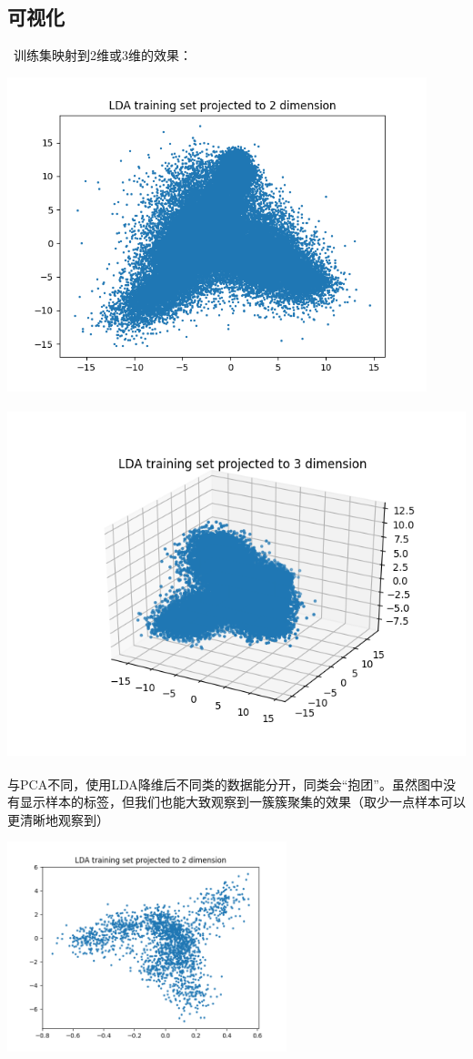 \documentclass[hyperref,UTF8]{ctexart}
\begin{document}
\subsection*{可视化}\
训练集映射到2维或3维的效果：\\
\centerline{\includegraphics[height=3.6in]{exp-results/lda2.png}}
\centerline{\includegraphics[height=4in]{exp-results/lda3.png}}
\par 与PCA不同，使用LDA降维后不同类的数据能分开，同类会“抱团”。虽然图中没有显示样本的标签，但我们也能大致观察到一簇簇聚集的效果（取少一点样本可以更清晰地观察到）
\centerline{\includegraphics[height=2.4in]{exp-results/lda2test.png}}
\end{document}
